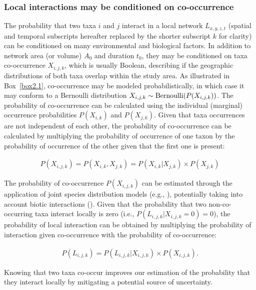 \subsubsection{Local interactions may be conditioned on co-occurrence}

The probability that two taxa $i$ and $j$ interact in a local network
$L_{x,y,z,t}$ (spatial and temporal subscripts hereafter replaced by the shorter
subscript $k$ for clarity) can be conditioned on many environmental and
biological factors. In addition to network area (or volume) $A_0$ and duration
$t_0$, they may be conditioned on taxa co-occurrence $X_{i,j,k}$, which is
usually Boolean, describing if the geographic distributions of both taxa overlap
within the study area. As illustrated in Box~\ref{box2.1}, co-occurrence may be
modeled probabilistically, in which case it may conform to a Bernoulli
distribution $X_{i,j,k} \sim {\rm Bernoulli}(P(X_{i,j,k}))$. The probability of
co-occurrence can be calculated using the individual (marginal) occurrence
probabilities $P(X_{i,k})$ and $P(X_{j,k})$. Given that taxa occurrences are not
independent of each other, the probability of co-occurrence can be calculated by
multiplying the probability of occurrence of one taxon by the probability of
occurrence of the other given that the first one is present: 

\begin{eqnarray}
  \label{eq:modelcoprob}
     P(X_{i,j,k}) = P(X_{i,k}, X_{j,k})= P(X_{i,k} | X_{j,k}) \times P(X_{j,k})
\end{eqnarray}

The probability of co-occurrence $P(X_{i,j,k})$ can be estimated through the
application of joint species distribution models (e.g.,
\cite{Pollock2014Understanding}), potentially taking into account biotic
interactions (\cite{Staniczenko2017Linking}). Given that the probability that
two non-co-occurring taxa interact locally is zero (i.e., $P(L_{i, j, k}|
X_{i,j,k} = 0) = 0$), the probability of local interaction can be obtained by
multiplying the probability of interaction given co-occurrence with the
probability of co-occurrence: 

\begin{eqnarray}
  \label{eq:co-occur}
    P(L_{i, j, k}) = P(L_{i, j, k}| X_{i,j,k}) \times P(X_{i,j,k}).
\end{eqnarray}

Knowing that two taxa co-occur improves our estimation of the probability that
they interact locally by mitigating a potential source of uncertainty.

